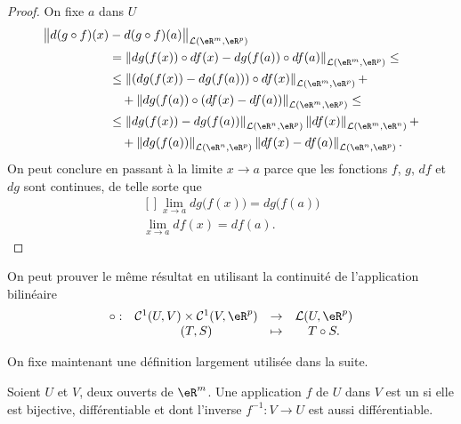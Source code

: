 \begin{proof} On fixe $a$ dans $U$ 
  \begin{equation}
    \begin{aligned}
     \big\|d(g\circ f)(x)&-d(g\circ f)(a)\big\|_{\mathcal{L}(\eR^m,\eR^p)}\\
     &=\left\|dg(f(x))\circ df(x)-dg(f(a))\circ df(a)\right\|_{\mathcal{L}(\eR^m,\eR^p)}\leq\\
&\leq \left\|\left(dg(f(x))-dg(f(a))\right)\circ df(x)\right\|_{\mathcal{L}(\eR^m,\eR^p)}+\\
&\quad+ \left\|dg(f(a))\circ \left(df(x)-df(a)\right)\right\|_{\mathcal{L}(\eR^m,\eR^p)}\leq\\
&\leq \left\|dg(f(x))-dg(f(a))\right\|_{\mathcal{L}(\eR^n,\eR^p)}\left\| df(x)\right\|_{\mathcal{L}(\eR^m,\eR^n)}+\\
&\quad+ \left\|dg(f(a))\right\|_{\mathcal{L}(\eR^n,\eR^p)}\left\| df(x)-df(a)\right\|_{\mathcal{L}(\eR^n,\eR^p)}.\\
    \end{aligned}
  \end{equation}
On peut conclure en passant à la limite $x\to a$ parce que les fonctions $f$, $g$, $df$ et $dg$ sont continues, de telle sorte que
\begin{equation}
	\begin{aligned}[]
		\lim_{x\to a} dg\big( f(x) \big)=dg\big( f(a) \big)\\
		\lim_{x\to a} df(x)=df(a).
	\end{aligned}
\end{equation}
\end{proof}

\begin{remark}
  On peut prouver le même résultat en utilisant la continuité de l'application bilinéaire 
\begin{equation}
  \begin{array}{rccc}
    \circ : & \mathcal{C}^1(U,V)\times\mathcal{C}^1(V,\eR^p)  & \to & \mathcal{L}(U, \eR^p)\\
& (T,S)& \mapsto & T\circ S.
  \end{array}
\end{equation}
\end{remark}

On fixe maintenant une définition largement utilisée dans la suite. 
\begin{definition}
	 Soient $U$ et $V$, deux ouverts de $\eR^m$. Une application $f$ de $U$ dans $V$ est un  si elle est bijective, différentiable et dont l'inverse $f^{-1}:V\to U $ est aussi différentiable. 
\end{definition}

